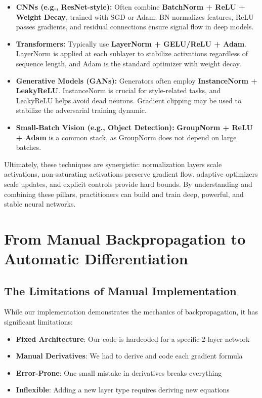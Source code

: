 \documentclass{article}
\begin{document}
\begin{itemize}
    \item \textbf{CNNs (e.g., ResNet-style):} Often combine \textbf{BatchNorm + ReLU + Weight Decay}, trained with SGD or Adam. BN normalizes features, ReLU passes gradients, and residual connections ensure signal flow in deep models.
    \item \textbf{Transformers:} Typically use \textbf{LayerNorm + GELU/ReLU + Adam}. LayerNorm is applied at each sublayer to stabilize activations regardless of sequence length, and Adam is the standard optimizer with weight decay.
    \item \textbf{Generative Models (GANs):} Generators often employ \textbf{InstanceNorm + LeakyReLU}. InstanceNorm is crucial for style-related tasks, and LeakyReLU helps avoid dead neurons. Gradient clipping may be used to stabilize the adversarial training dynamic.
    \item \textbf{Small-Batch Vision (e.g., Object Detection):} \textbf{GroupNorm + ReLU + Adam} is a common stack, as GroupNorm does not depend on large batches.
\end{itemize}

Ultimately, these techniques are synergistic: normalization layers scale activations, non-saturating activations preserve gradient flow, adaptive optimizers scale updates, and explicit controls provide hard bounds. By understanding and combining these pillars, practitioners can build and train deep, powerful, and stable neural networks.



\section{From Manual Backpropagation to Automatic Differentiation}

\subsection{The Limitations of Manual Implementation}

While our implementation demonstrates the mechanics of backpropagation, it has significant limitations:
\begin{itemize}
    \item \textbf{Fixed Architecture}: Our code is hardcoded for a specific 2-layer network
    \item \textbf{Manual Derivatives}: We had to derive and code each gradient formula
    \item \textbf{Error-Prone}: One small mistake in derivatives breaks everything
    \item \textbf{Inflexible}: Adding a new layer type requires deriving new equations
\end{itemize}
\end{document}
